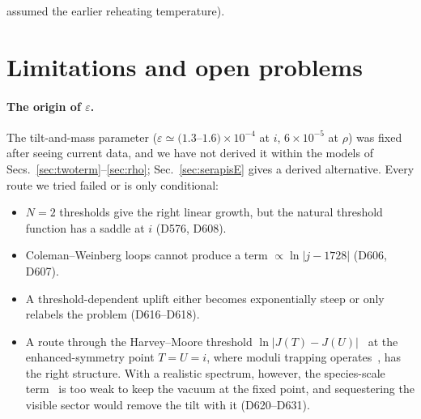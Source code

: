 \documentclass[aps,prd,twocolumn,superscriptaddress,nofootinbib,floatfix]{revtex4-2}
\begin{document}
assumed the earlier reheating temperature).

\section{Limitations and open problems}\label{sec:limits}
\paragraph{The origin of $\varepsilon$.} The tilt-and-mass parameter ($\varepsilon \simeq (1.3$--$1.6)\times10^{-4}$ at $i$, $6\times10^{-5}$ at $\rho$) was fixed after seeing current data, and we have not derived it within the models of Secs.~\ref{sec:twoterm}--\ref{sec:rho}; Sec.~\ref{sec:serapisE} gives a derived alternative. Every route we tried failed or is only conditional:
\begin{itemize}
\item $N=2$ thresholds give the right linear growth, but the natural threshold function has a saddle at $i$ (D576, D608).
\item Coleman--Weinberg loops cannot produce a term $\propto\ln|j-1728|$ (D606, D607).
\item A threshold-dependent uplift either becomes exponentially steep or only relabels the problem (D616--D618).
\item A route through the Harvey--Moore threshold $\ln|J(T)-J(U)|$~\cite{arXiv_hep-th_9510182} at the enhanced-symmetry point $T = U = i$, where moduli trapping operates~\cite{arXiv_hep-th_0403001}, has the right structure. With a realistic spectrum, however, the species-scale term~\cite{arXiv_2507_05345} is too weak to keep the vacuum at the fixed point, and sequestering the visible sector would remove the tilt with it (D620--D631).
\end{itemize}
\end{document}
